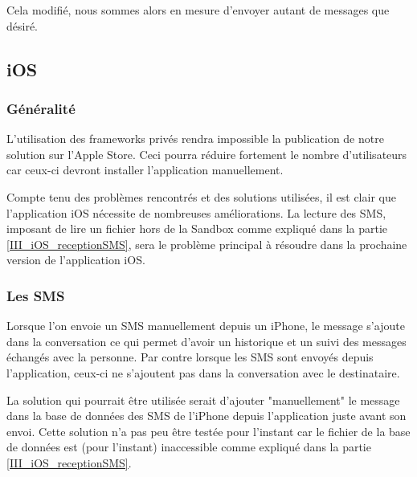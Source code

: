 Cela modifié, nous sommes alors en mesure d'envoyer autant de messages que désiré. 




\subsection{iOS}


\subsubsection{Généralité}

L'utilisation des frameworks privés rendra impossible la publication de notre solution sur l'Apple Store.
Ceci pourra réduire fortement le nombre d'utilisateurs car ceux-ci devront installer l'application manuellement. 

Compte tenu des problèmes rencontrés et des solutions utilisées, il est clair que l'application iOS nécessite de nombreuses améliorations.
La lecture des SMS, imposant de lire un fichier hors de la Sandbox comme expliqué dans la partie \ref{III_iOS_receptionSMS}, sera le problème principal à résoudre dans la prochaine version de l'application iOS.


\subsubsection{Les SMS}

Lorsque l'on envoie un SMS manuellement depuis un iPhone, le message s'ajoute dans la conversation ce qui permet d'avoir un historique et un suivi des messages échangés avec la personne.
Par contre lorsque les SMS sont envoyés depuis l'application, ceux-ci ne s'ajoutent pas dans la conversation avec le destinataire.

La solution qui pourrait être utilisée serait d'ajouter "manuellement" le message dans la base de données des SMS de l'iPhone depuis l'application juste avant son envoi.
Cette solution n'a pas peu être testée pour l'instant car le fichier de la base de données est (pour l'instant) inaccessible comme expliqué dans la partie \ref{III_iOS_receptionSMS}.
\\

